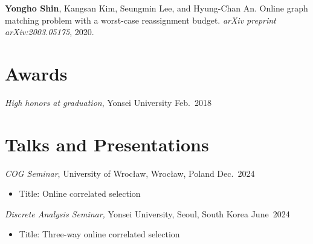 \documentclass{article}
\newcommand{\killinitspace}{-0.7em}
\begin{document}
\textbf{Yongho Shin}, Kangsan Kim, Seungmin Lee, and Hyung-Chan An. Online graph matching problem with a worst-case reassignment budget. \emph{arXiv preprint arXiv:2003.05175}, 2020.

\section{Awards}
\textsl{High honors at graduation}, Yonsei University \hfill Feb.~2018

\section{Talks and Presentations}
\textsl{COG Seminar}, University of Wrocław, Wrocław, Poland  \hfill Dec.~2024
\vspace{\killinitspace}
\begin{itemize}
\item Title: Online correlated selection
\end{itemize}

\textsl{Discrete Analysis Seminar,} Yonsei University, Seoul, South Korea \hfill June~2024
\vspace{\killinitspace}
\begin{itemize}
\item Title: Three-way online correlated selection
\end{itemize}
\end{document}
